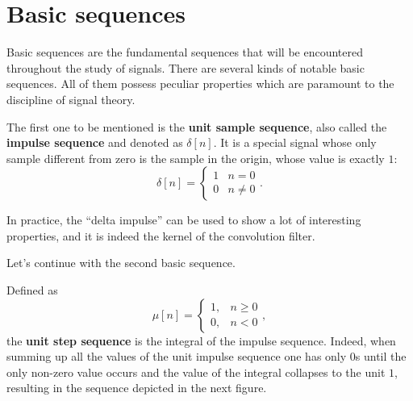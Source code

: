 \documentclass[\documentfontsize, twocolumn]{\classname}
\begin{document}
\section{Basic se\-quen\-ces}
Basic se\-quen\-ces are the fundamental se\-quen\-ces that will be encountered throughout the study of signals.
There are several kinds of notable basic se\-quen\-ces. All of them possess peculiar properties which are paramount to the discipline of signal theory.

The first one to be mentioned is the \textbf{unit sample se\-quen\-ce}, also called the \textbf{impulse se\-quen\-ce} and denoted as $\delta[n]$. It is a special signal whose only sample different from zero is the sample in the origin, whose value is exactly $1$: \[\delta[n] = \left\{\begin{array}{ll} 1 & n = 0\\ 0 & n \neq 0 \end{array}\right..\]

\begin{center}
\end{center}

In practice, the ``delta impulse'' can be used to show a lot of interesting properties, and it is indeed the kernel of the convolution filter.

Let's continue with the second basic se\-quen\-ce.

Defined as \[\mu[n] = \left\{\begin{array}{ll}1, & n \geq 0 \\ 0, & n < 0\end{array}\right.,\] the \textbf{unit step se\-quen\-ce} is the integral of the impulse se\-quen\-ce. Indeed, when summing up all the values of the unit impulse se\-quen\-ce one has only $0$s until the only non-zero value occurs and the value of the integral collapses to the unit $1$, resulting in the sequence depicted in the next figure.
\end{document}

